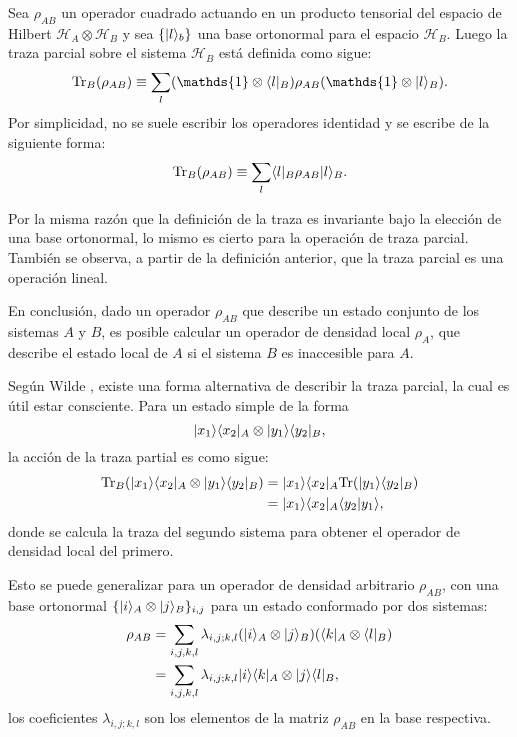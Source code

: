 \begin{definition}
Sea  $ \rho_{AB}$ un operador cuadrado actuando en un producto tensorial del
espacio de Hilbert $\mathcal{H}_A \otimes \mathcal{ H}_B$ y sea $\{|l\rangle_b\}$
una base ortonormal para el espacio $\mathcal{H}_B$. Luego la traza parcial
sobre el sistema $\mathcal{H}_B$ está definida como sigue: 
\begin{equation}
		\tr_B(\rho_{AB})\equiv\sum_{l} (\mathds{1}\otimes\la l|_B)\rho_{AB}(\mathds{1}\otimes|l\ra_B).	
\end{equation} 
Por simplicidad, no se suele escribir los operadores identidad y se escribe de la siguiente forma:
\begin{equation}
	{\rm Tr}_B(\rho_{AB})\equiv\sum_{l} \langle l|_B\rho_{AB}|l\rangle_B.
\end{equation}
\end{definition}

Por la misma razón que la definición de la traza es invariante bajo la elección
de una base ortonormal, lo mismo es cierto para la operación de traza parcial.
También se observa, a partir de la definición anterior, que la traza parcial es
una operación lineal.

En conclusión, dado un operador $\rho_{AB}$ que describe un estado conjunto de
los sistemas $A$ y $B$, es posible calcular un operador de densidad local
$\rho_A$, que describe el estado local de $A$ si el sistema $B$ es inaccesible
para $A$.


Según Wilde {\cite{wilde2011classical}}, existe una forma alternativa de
describir la traza parcial, la cual es útil estar consciente. Para un estado
simple de la forma  
\begin{equation}
	|x_1\rangle \langle x_2|_A\otimes|y_1\rangle \langle y_2|_B,
\end{equation} 
la acción de la traza partial es como sigue: 
\begin{equation}
	\begin{split}
	{\rm Tr}_B(	|x_1\rangle \langle x_2|_A\otimes|y_1\rangle \langle y_2|_B)&=|x_1\rangle \langle x_2|_A{\rm Tr}(|y_1\rangle \langle y_2|_B)\\
	&=|x_1\rangle \langle x_2|_A \langle y_2|y_1\rangle,
	\end{split}
\end{equation}
donde se calcula la traza del segundo sistema para obtener el operador de
densidad local del primero.

Esto se puede generalizar para un operador de densidad arbitrario $\rho_{AB}$,
con una base ortonormal $\{|i \rangle_A \otimes |j\rangle_B \} _{i,j}$ para un estado
conformado por dos sistemas:
\begin{equation}
	\begin{split}
	\rho_{AB}&=\sum_{i,j,k,l}\lambda_{i,j;k,l}(|i\rangle_A \otimes|j\rangle_B)(\langle k|_A\otimes \langle l|_B)\\
	&=\sum_{i,j,k,l}\lambda_{i,j;k,l} |i\rangle \langle k|_A\otimes|j\rangle \langle l|_B,
	\end{split}
\end{equation}
los coeficientes $\lambda_{i,j;k,l}$  son los elementos de la matriz $\rho_{AB}$ en la base respectiva.


